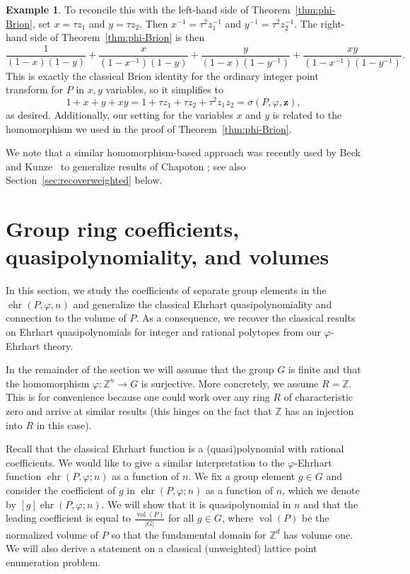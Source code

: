 \documentclass[12pt,reqno]{amsart}
\theoremstyle{definition}
\newtheorem{exam}[thm]{Example}
\theoremstyle{remark}
\DeclareMathOperator{\vol}{vol}
\newcommand{\Z}{\mathbb{Z}}
\renewcommand{\phi}{\varphi}
\DeclareMathOperator{\ehr}{ehr}
\begin{document}
\begin{exam}
To reconcile this with the left-hand side of Theorem~\ref{thm:phi-Brion}, set $x=\tau z_1$ and $y=\tau z_2$. Then $x^{-1}=\tau^2z_1^{-1}$ and $y^{-1}=\tau^2z_2^{-1}$. The right-hand side of Theorem~\ref{thm:phi-Brion} is then
\[
\frac{1}{(1-x)(1-y)} + \frac{x}{(1-x^{-1})(1-y)} + \frac{y}{(1-x)(1-y^{-1})} + \frac{xy}{(1-x^{-1})(1-y^{-1})}.
\]
This is exactly the classical Brion identity for the ordinary integer point transform for $P$ in $x,y$ variables, so it simplifies to 
\[
1+x+y+xy=1+\tau z_1 + \tau z_2 + \tau^2 z_1 z_2 = \sigma(P,\phi,\mathbf{z}),
\]
as desired. Additionally, our setting for the variables $x$ and $y$ is related to the homomorphism we used in the proof of Theorem~\ref{thm:phi-Brion}.
\end{exam}

We note that a similar homomorphism-based approach was recently used by Beck and Kunze~\cite{beck2025} to generalize results of Chapoton \cite{chapoton_2016}; see also Section~\ref{sec:recoverweighted} below.



\section{Group ring coefficients, quasipolynomiality, and volumes} 
\label{sec:classical}

 In this section, we study the coefficients of separate group elements in the $\ehr(P,\phi,n)$ and generalize the classical Ehrhart quasipolynomiality and connection to the volume of $P$. As a consequence, we recover the classical results on Ehrhart quasipolynomials for integer and rational polytopes from our $\varphi$-Ehrhart theory. 

In the remainder of the section we will assume that the group $G$ is finite and that the homomorphism $\varphi: \Z^n \rightarrow G$ is surjective. More concretely, we assume $R=\Z$. 
This is for convenience because one could work over any ring $R$ of characteristic zero and arrive at similar results (this hinges on the fact that $\Z$ has an injection into $R$ in this case). 

Recall that the classical Ehrhart function is a (quasi)polynomial with rational coefficients. We would like to give a similar interpretation to the $\varphi$-Ehrhart function $\ehr(P,\varphi;n)$ as a function of $n$. We fix a group element $g\in G$ and consider the coefficient of $g$ in $\ehr(P,\varphi;n)$ as a function of $n$, which we denote by $[g]\ehr(P,\varphi;n)$.  We will show that it is quasipolynomial in $n$ and that the leading coefficient is equal to $\frac{\vol(P)}{|G|}$ for all $g\in G$, where $\vol(P)$ be the normalized volume of $P$ so that the fundamental domain for $\Z^d$ has volume one. We will also derive a statement on a classical (unweighted) lattice point enumeration problem.
\end{document}
